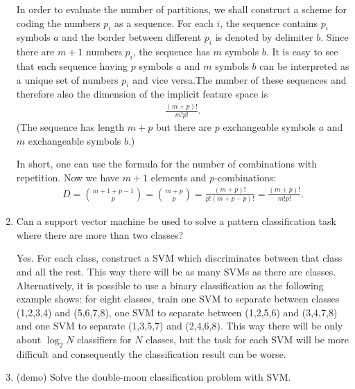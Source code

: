 \begin{enumerate}
\begin{solution}
    In order to evaluate the number of partitions, we shall construct a
    scheme for coding the numbers $p_i$ as a sequence.  For each $i$,
    the sequence contains $p_i$ symbols $a$ and the border between
    different $p_i$ is denoted by delimiter $b$.  Since there are $m+1$
    numbers $p_i$, the sequence has $m$ symbols $b$.  It is easy to see
    that each sequence having $p$ symbols $a$ and $m$ symbols $b$ can be
    interpreted as a unique set of numbers $p_i$ and vice versa.The
    number of these sequences and therefore also the dimension of the
    implicit feature space is
    \begin{align*}
      \frac{(m+p)!}{m!p!}.
    \end{align*}
    (The sequence has length $m+p$ but there are $p$ exchangeable
    symbols $a$ and $m$ exchangeable symbols $b$.)
    
    In short, one can use the formula for the number of combinations
    with repetition.  Now we have $m+1$ elements and $p$-combinations:
    \begin{align*}
      D = \binom{m+1+p-1}{p} = \binom{m+p}{p} =
      \frac{(m+p)!}{p!(m+p-p)!}  = \frac{(m+p)!}{m!p!}.
    \end{align*}
  \end{solution}
  

\item Can a support vector machine be used to solve a pattern
  classification task where there are more than two classes?

  \begin{solution}

    Yes.  For each class, construct a SVM which discriminates
    between that class and all the rest.  This way there will be as many
    SVMs as there are classes.  Alternatively, it is possible to use a
    binary classification as the following example shows: for eight
    classes, train one SVM to separate between classes (1,2,3,4) and
    (5,6,7,8), one SVM to separate between (1,2,5,6) and (3,4,7,8) and
    one SVM to separate (1,3,5,7) and (2,4,6,8).  This way there will be
    only about $\log_2 N$ classifiers for $N$ classes, but the task for
    each SVM will be more difficult and consequently the classification
    result can be worse.

  \end{solution}


\item (demo) Solve the double-moon classification problem with SVM.


\end{enumerate}
